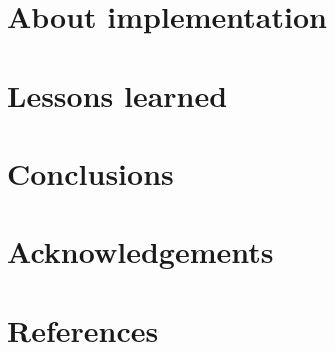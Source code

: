 \documentclass{netobjectdays}
\begin{document}
\section{About implementation}

\section{Lessons learned}

\section{Conclusions}
\section{Acknowledgements}
\section{References}



\end{document}
